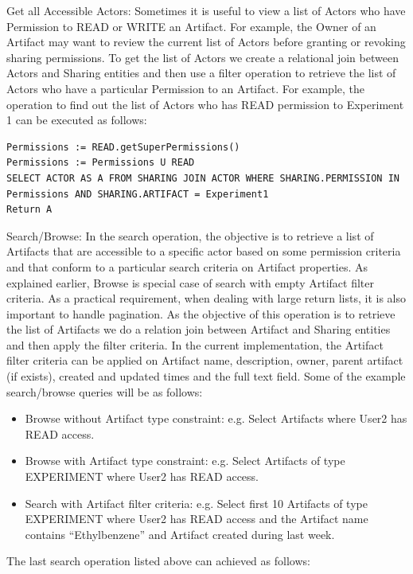 \documentclass[sigconf]{acmart}
\begin{document}
Get all Accessible Actors: Sometimes it is useful to view a list of Actors who have Permission to READ or WRITE an Artifact. For example, the Owner of an Artifact may want to review the current list of Actors before granting or revoking sharing permissions. To get the list of Actors we create a relational join between Actors and Sharing entities and then use a filter operation to retrieve the list of Actors who have a particular Permission to an Artifact. For example, the operation to find out the list of Actors who has READ permission to Experiment 1 can be executed as follows:

\begin{lstlisting}
Permissions := READ.getSuperPermissions()
Permissions := Permissions U READ
SELECT ACTOR AS A FROM SHARING JOIN ACTOR WHERE SHARING.PERMISSION IN Permissions AND SHARING.ARTIFACT = Experiment1
Return A
\end{lstlisting}

Search/Browse: In the search operation, the objective is to retrieve a list of Artifacts that are accessible to a specific actor based on some permission criteria and that conform to a particular search criteria on Artifact properties. As explained earlier, Browse is special case of search with empty Artifact filter criteria. As a practical requirement, when dealing with large return lists, it is also important to handle pagination. As the objective of this operation is to retrieve the list of Artifacts we do a relation join between Artifact and Sharing entities and then apply the filter criteria. In the current implementation, the Artifact filter criteria can be applied on Artifact name, description, owner, parent artifact (if exists), created and updated times and the full text field. Some of the example search/browse queries will be as follows:

\begin{itemize}
\item
Browse without Artifact type constraint: e.g. Select Artifacts where User2 has READ access.
\item
Browse with Artifact type constraint: e.g. Select Artifacts of type EXPERIMENT where User2 has READ access.
\item
Search with Artifact filter criteria: e.g. Select first 10 Artifacts of type EXPERIMENT where User2 has READ access and the Artifact name contains ``Ethylbenzene'' and Artifact created during last week.
\end{itemize}

The last search operation listed above can achieved as follows:
\end{document}
